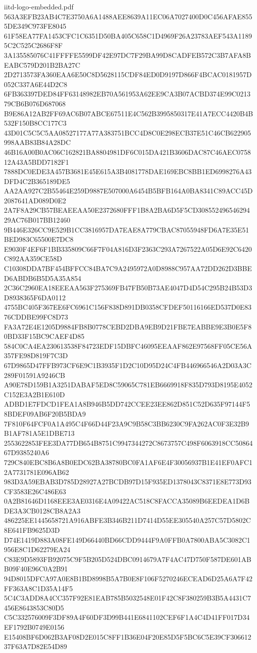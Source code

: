 \begin{filecontents*}[overwrite]{iitd-logo-embedded.pdf}
563A3EFB23AB4C7E3750A6A1488AEE8639A11EC06A7027400D0C456AFAE8555DE349C973FE8045
61F58EA77FA1453CFC1C6351D50BA405C658C1D4969F26A23783AEF543A11895C2C525C2686F8F
3A135585076C41FFFFE5599DF42E97DC7F29BA99D8CADFEB572C3B7AFA8BEABC579D201B2BA27C
2D2713573FA360EAA6E50C8D5628115CDF84ED0D9197D866F4BCAC0181957D052C337A6E44D2C8
6FB363397DED84FF63148982EB70A561953A62EE9CA3B07ACBD374E99C021379CB6B076D687068
B9E86A12AB2FF69AC6B07ABCE67511E4C562B3995850317E41A7ECC4420B4B532F150B8CC177C3
43D01C5C5C5AA08527177A77A383751BCC4D8C0E298ECB37E51C46CB622905998AAB83B84A28DC
46B16A00B0AC06C162821BA8804981DF6C015DA421B3606DAC87C46AEC075812A43A5BDD7182F1
7888DC0EDE3A457B3681E45E615A3B4081778DAE169EBC8BB1ED6998276A43DFD4C2B365189DE5
AA2AA927C2B55464E259D9887E507000A6454B5BFB164A0BA8341C89ACC45D2087641AD089D0E2
2A7F8A29CB57BEAEEAA50E2372680FFF1B8A2BA6D5F5CD30855249654629429AC76B017BB12460
9B446E326CC9E529B1CC3816957DA7EAE8A779CBAC87055948FD6A7E35E51BED983C65500E7DC8
E9030F4EF6F1BB335809C66F7F04A816D3F2363C293A7267522A05D6E92C6420C892AA359CE58D
C10308DDA7BF454BFFCC84BA7C9A2495972A0D8988C957AA72DD262D3BBED6ABDB6B5D5A35A854
2C36C2960EA18EEEAA563F275369FB47FB50B73AE4047D4D54C295B24B53D3D8938365F6DA0112
4755BC405F367EE6FC6961C156F838D891DB0358CFDEF50116166ED537D0E8376CDDBE99FC8D73
FA3A72E4E1205D9884FB8B0778CEBD2DBA9EB9D21FBE7EABBE9E3B0E5F80BD33F15BC9CAEF4D85
584C0CA4EA230613538F84723EDF15DBFC46095EEAAF862E97568FF05CE56A357FE98D819F7C3D
67D9865D47FFB973CF6E9C1B3935F1D2C10D95D24C4FB446966546A2D03A3C289F01591A9246CB
A90E78D159B1A3251DABAF5ED8C59065C781EB6669918F835D793D8195E4052C152E3A2B1E610D
ADBD1E7FDCD1FEA1A8B946B5DD742CCEE23EE862D851C52D635F97144F58BDEF09AB6F20B5BDA9
7F810F64FCF0A1A495C4F66D44F23A9C9B58C3BB6230C9FA262AC0F3E32B9B1AF781A5E1DBE713
2553622853FEE3DA77DB654B8751C9947344272C8673757C498F6063918CC5086467D9385240A6
729C840EBC8B6A8B0EDC62BA38780BC0FA1AF6E4F30056937B1E41EF0AFC12A7731781E096AB62
983D3A59EBAB3D785D28927A27BCDB97D15F935ED1378043C8371E8E773D93CF3583E26C486E63
0A2B81646D1168EEE3AE0316E4A09422AC518C8FACCA35089B6EEDEA1D6BDE3A3CB0128CB8A2A3
486225EE1445658721A916ABFE3B346B211D7414D55EE305540A257C57D5802C8E641FB9625D3D
D74E1419D883A08FE149D66440BD66CDD9444F9A0FFB0A7800ABA5C3082C1956E8C1D62279EA24
C83E9D5893FB92075C9F5B205D524DBC0914679A7F4AC47D750F587DE601ABB09F40E96C0A2B91
94D8015DFCA97A0E8B1BD8998B5A7B0E8F106F5270246ECEAD6D25A6A7F42FF363A8C1D35A14F5
5C4C3ADD8A4CC357F92E81EAB785B5032548E01F42C8F380259B3B5A4431C7456E8643853C80D5
C5C332576009F3DF89A4F60DF3D99B441E6841102CEF6F1A4C4D41FF017D34EF1792B0749E0156
E15408BF6D062B3AF08D2E015C8FF1B36E04F20E85D5F5BC6C5E39CF30661237F63A7D82E54D89

\end{filecontents*}
